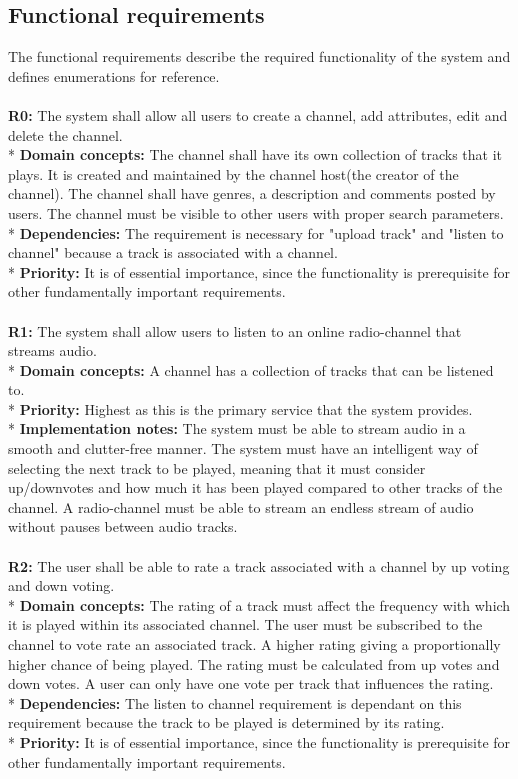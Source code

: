 \documentclass[a4paper,11pt,report]{article}
\begin{document}
\subsection{Functional requirements}
The functional requirements describe the required functionality of the system and defines enumerations for reference.
\\ \\
\textbf{R0:}
The system shall allow all users to create a channel, add attributes, edit and delete the channel. \\*
\textbf{Domain concepts:}
The channel shall have its own collection of tracks that it plays. It is created and maintained by the channel host(the creator of the channel).
The channel shall have genres, a description and comments posted by users.
The channel must be visible to other users with proper search parameters. \\*
\textbf{Dependencies:} 
The requirement is necessary for "upload track" and "listen to channel" because a track is associated with a channel. \\*
\textbf{Priority:} 
It is of essential importance, since the functionality is prerequisite for other fundamentally important requirements.
\\ \\

\textbf{R1:}
The system shall allow users to listen to an online radio-channel that streams audio. \\*
\textbf{Domain concepts:}
A channel has a collection of tracks that can be listened to. \\*
\textbf{Priority:}
Highest as this is the primary service that the system provides. \\*
\textbf{Implementation notes:}
The system must be able to stream audio in a smooth and clutter-free manner. The system must have an intelligent way of selecting the next track to be played, meaning that it must consider up/downvotes and how much it has been played compared to other tracks of the channel.
A radio-channel must be able to stream an endless stream of audio without pauses between audio tracks.
\\ \\

\textbf{R2:}
The user shall be able to rate a track associated with a channel by up voting and down voting. \\*
\textbf{Domain concepts:}
The rating of a track must affect the frequency with which it is played within its associated channel. The user must be subscribed to the channel to vote rate an associated track.
A higher rating giving a proportionally higher chance of being played. The rating must be calculated from up votes and down votes. A user can only have one vote per track that influences the rating. \\*
\textbf{Dependencies:}
The listen to channel requirement is dependant on this requirement because the track to be played is determined by its rating.\\*
\textbf{Priority:}
It is of essential importance, since the functionality is prerequisite for other fundamentally important requirements.
\\ \\
\end{document}
